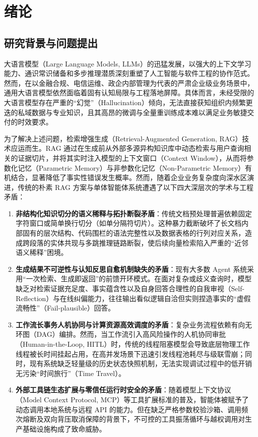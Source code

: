 
\chapter{绪论}

\section{研究背景与问题提出}

大语言模型（Large Language Models, LLMs）的迅猛发展，以强大的上下文学习能力、通识常识储备和多步推理潜质深刻重塑了人工智能与软件工程的协作范式\cite{Vaswani2017Attention,Devlin2019BERT,DeepSeek2024V2}。然而，在以金融合规、电信运维、政企内部管理为代表的严肃企业级业务场景中，通用大语言模型依然面临着固有认知局限与工程落地屏障。具体而言，未经受限的大语言模型存在严重的“幻觉”（Hallucination）倾向，无法直接获知组织内频繁更迭的私域数据与专业知识，且其高昂的微调与全量重训练成本难以满足业务敏捷交付的时效要求\cite{Lewis2020RAG,Gao2023RAGSurvey}。

为了解决上述问题，检索增强生成（Retrieval-Augmented Generation, RAG）\cite{Lewis2020RAG}技术应运而生。RAG 通过在生成前从外部多源异构知识库中动态检索与用户查询相关的证据切片，并将其实时注入模型的上下文窗口（Context Window），从而将参数化记忆（Parametric Memory）与非参数化记忆（Non-Parametric Memory）有机结合，显著降低了事实性错误发生概率。然而，随着企业业务复杂度向深水区演进，传统的朴素 RAG 方案与单体智能体系统遭遇了以下四大深层次的学术与工程矛盾：

\begin{enumerate}
    \item \textbf{非结构化知识切分的语义稀释与拓扑断裂矛盾}：传统文档预处理普遍依赖固定字符窗口或简单换行切分（如单分隔符切片）。这种暴力截断破坏了长文档内部固有的层次结构、代码围栏的语法完整性以及数据表格的行列对应关系，造成跨段落的实体共现与多跳推理链路断裂，使后续向量检索陷入严重的“近邻语义稀释”困境。
    \item \textbf{生成结果不可逆性与认知反思自愈机制缺失的矛盾}：现有大多数 Agent 系统采用“一次检索、生成即返回”的前馈开环模式。在面对复杂或歧义查询时，模型缺乏对检索证据充足度、事实蕴含性以及自身回答合理性的自我审视（Self-Reflection）与在线纠偏能力，往往输出看似逻辑自洽但实则捏造事实的“虚假流畅性”（Fail-plausible）回答\cite{Asai2023SelfRAG,Yan2024CRAG}。
    \item \textbf{工作流长事务人机协同与计算资源高效调度的矛盾}：复杂业务流程依赖有向无环图（DAG）编排。然而，当工作流引入高风险操作的人机协同审批（Human-in-the-Loop, HITL）时，传统的线程阻塞模型会导致底层物理工作线程被长时间挂起占用，在高并发场景下迅速引发线程池耗尽与级联雪崩；同时，现有系统缺乏轻量级的历史状态快照机制，无法实现调试过程中的低开销无污染“时间旅行”（Time Travel）。
    \item \textbf{外部工具链生态扩展与零信任运行时安全的矛盾}：随着模型上下文协议（Model Context Protocol, MCP）等工具扩展标准的普及，智能体被赋予了动态调用本地系统与远程 API 的能力。但在缺乏严格参数校验沙箱、调用频次熔断及双向背压取消保障的背景下，不可控的工具振荡循环与越权调用对生产基础设施构成了致命威胁。
\end{enumerate}

